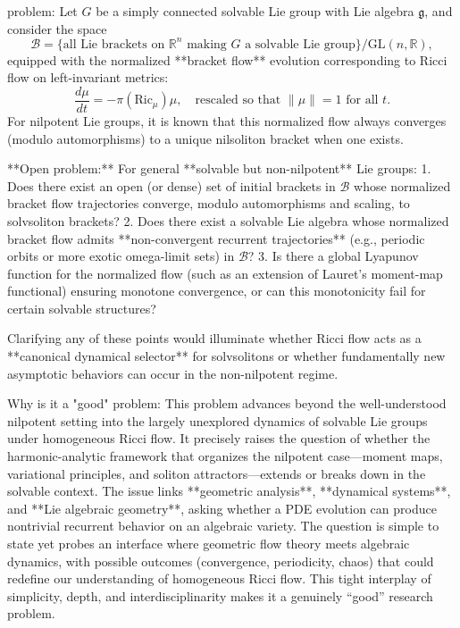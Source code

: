 problem:  
Let \( G \) be a simply connected solvable Lie group with Lie algebra \( \mathfrak{g} \), and consider the space  
\[
\mathcal{B} = \{\text{all Lie brackets on } \mathbb{R}^n \text{ making } G \text{ a solvable Lie group}\}/\mathrm{GL}(n,\mathbb{R}),
\]  
equipped with the normalized **bracket flow** evolution corresponding to Ricci flow on left-invariant metrics:
\[
\frac{d\mu}{dt} = -\pi(\mathrm{Ric}_\mu)\mu, \quad \text{rescaled so that } \|\mu\|=1 \text{ for all } t.
\]
For nilpotent Lie groups, it is known that this normalized flow always converges (modulo automorphisms) to a unique nilsoliton bracket when one exists.  

**Open problem:**  
For general **solvable but non-nilpotent** Lie groups:
1. Does there exist an open (or dense) set of initial brackets in \( \mathcal{B} \) whose normalized bracket flow trajectories converge, modulo automorphisms and scaling, to solvsoliton brackets?  
2. Does there exist a solvable Lie algebra whose normalized bracket flow admits **non-convergent recurrent trajectories** (e.g., periodic orbits or more exotic omega-limit sets) in \( \mathcal{B} \)?  
3. Is there a global Lyapunov function for the normalized flow (such as an extension of Lauret’s moment-map functional) ensuring monotone convergence, or can this monotonicity fail for certain solvable structures?

Clarifying any of these points would illuminate whether Ricci flow acts as a **canonical dynamical selector** for solvsolitons or whether fundamentally new asymptotic behaviors can occur in the non-nilpotent regime.  

Why is it a "good" problem:  
This problem advances beyond the well-understood nilpotent setting into the largely unexplored dynamics of solvable Lie groups under homogeneous Ricci flow. It precisely raises the question of whether the harmonic-analytic framework that organizes the nilpotent case—moment maps, variational principles, and soliton attractors—extends or breaks down in the solvable context. The issue links **geometric analysis**, **dynamical systems**, and **Lie algebraic geometry**, asking whether a PDE evolution can produce nontrivial recurrent behavior on an algebraic variety.  
The question is simple to state yet probes an interface where geometric flow theory meets algebraic dynamics, with possible outcomes (convergence, periodicity, chaos) that could redefine our understanding of homogeneous Ricci flow. This tight interplay of simplicity, depth, and interdisciplinarity makes it a genuinely “good” research problem.
